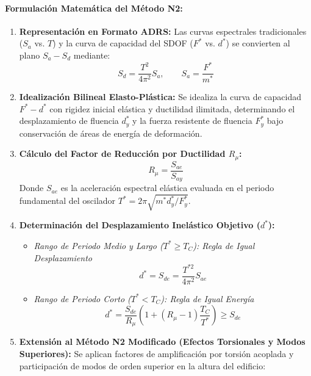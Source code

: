 \documentclass[11pt,letterpaper]{article}
\begin{document}
\begin{modulebox}
\paragraph{Formulación Matemática del Método N2:}
\begin{enumerate}
    \item \textbf{Representación en Formato ADRS:}
    Las curvas espectrales tradicionales ($S_a$ vs. $T$) y la curva de capacidad del SDOF ($F^*$ vs. $d^*$) se convierten al plano $S_a - S_d$ mediante:
    \begin{equation}
        S_d = \frac{T^2}{4\pi^2} S_a, \qquad S_a = \frac{F^*}{m^*}
    \end{equation}
    \item \textbf{Idealización Bilineal Elasto-Plástica:}
    Se idealiza la curva de capacidad $F^*-d^*$ con rigidez inicial elástica y ductilidad ilimitada, determinando el desplazamiento de fluencia $d^*_y$ y la fuerza resistente de fluencia $F^*_y$ bajo conservación de áreas de energía de deformación.
    \item \textbf{Cálculo del Factor de Reducción por Ductilidad $R_\mu$:}
    \begin{equation}
        R_\mu = \frac{S_{ae}}{S_{ay}}
    \end{equation}
    Donde $S_{ae}$ es la aceleración espectral elástica evaluada en el periodo fundamental del oscilador $T^* = 2\pi\sqrt{m^* d^*_y / F^*_y}$.
    \item \textbf{Determinación del Desplazamiento Inelástico Objetivo ($d^*$):}
    \begin{itemize}
        \item \textit{Rango de Periodo Medio y Largo ($T^* \ge T_C$): Regla de Igual Desplazamiento}
        \begin{equation}
            d^* = S_{de} = \frac{T^{*2}}{4\pi^2} S_{ae}
        \end{equation}
        \item \textit{Rango de Periodo Corto ($T^* < T_C$): Regla de Igual Energía}
        \begin{equation}
            d^* = \frac{S_{de}}{R_\mu} \left( 1 + (R_\mu - 1)\frac{T_C}{T^*} \right) \ge S_{de}
        \end{equation}
    \end{itemize}
    \item \textbf{Extensión al Método N2 Modificado (Efectos Torsionales y Modos Superiores):}
    Se aplican factores de amplificación por torsión acoplada y participación de modos de orden superior en la altura del edificio:

\end{enumerate}
\end{modulebox}
\end{document}
